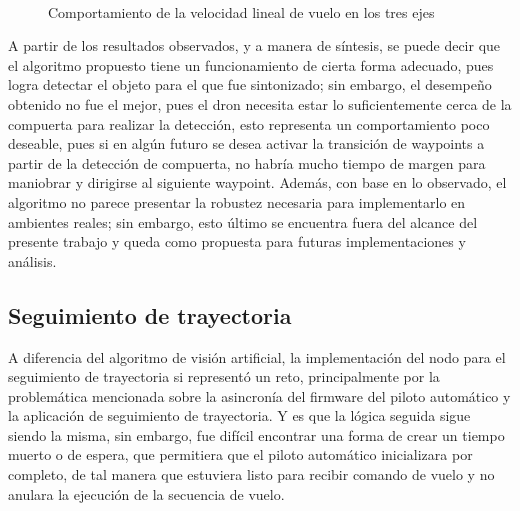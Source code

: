 \begin{figure}[ht]
    \centering
     \hspace{0.2 pt}
     \hspace{0.2 pt}
     \hspace{0.2 pt}
     \\
     \hspace{0.2 pt}
     \hspace{0.2 pt}
     \hspace{0.2 pt}
    
    \caption{Comportamiento de la velocidad lineal de vuelo en los tres ejes}
    \label{fig:ROS_gate4}
\end{figure}

A partir de los resultados observados, y a manera de síntesis, se puede decir que el algoritmo propuesto tiene un funcionamiento de cierta forma adecuado, pues logra detectar el objeto para el que fue sintonizado; sin embargo, el desempeño obtenido no fue el mejor, pues el dron necesita estar lo suficientemente cerca de la compuerta para realizar la detección, esto representa un comportamiento poco deseable, pues si en algún futuro se desea activar la transición de waypoints a partir de la detección de compuerta, no habría mucho tiempo de margen para maniobrar y dirigirse al siguiente waypoint. Además, con base en lo observado, el algoritmo no parece presentar la robustez necesaria para implementarlo en ambientes reales; sin embargo, esto último se encuentra fuera del alcance del presente trabajo y queda como propuesta para futuras implementaciones y análisis.


\subsection{Seguimiento de trayectoria}
A diferencia del algoritmo de visión artificial, la implementación del nodo para el seguimiento de trayectoria si representó un reto, principalmente por la problemática mencionada sobre la asincronía del firmware del piloto automático y la aplicación de seguimiento de trayectoria. Y es que la lógica seguida sigue siendo la misma, sin embargo, fue difícil encontrar una forma de crear un tiempo muerto o de espera, que permitiera que el piloto automático inicializara por completo, de tal manera que estuviera listo para recibir comando de vuelo y no anulara la ejecución de la secuencia de vuelo. 

